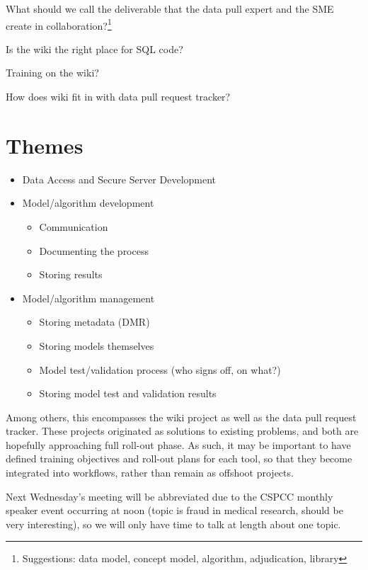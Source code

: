 \documentclass{tufte-handout}
\begin{document}
What should we call the deliverable that the data pull expert and the
SME create in collaboration?\footnote{Suggestions: data model, concept
model, algorithm, adjudication, library}

Is the wiki the right place for SQL code?

Training on the wiki?

How does wiki fit in with data pull request tracker?


\section{Themes}

\begin{itemize}
\item Data Access and Secure Server Development
\item Model/algorithm development

\begin{itemize}
\item Communication
\item Documenting the process
\item Storing results
\end{itemize}

\item Model/algorithm management

\begin{itemize}
\item Storing metadata (DMR)
\item Storing models themselves
\item Model test/validation process (who signs off, on what?)
\item Storing model test and validation results
\end{itemize}
\end{itemize}

Among others, this encompasses the wiki project as well as the data
pull request tracker. These projects originated as solutions to
existing problems, and both are hopefully approaching full roll-out
phase. As such, it may be important to have defined training
objectives and roll-out plans for each tool, so that they become
integrated into workflows, rather than remain as offshoot projects.
 
Next Wednesday's meeting will be abbreviated due to the CSPCC monthly
speaker event occurring at noon (topic is fraud in medical research,
should be very interesting), so we will only have time to talk at
length about one topic.
 
\end{document}
